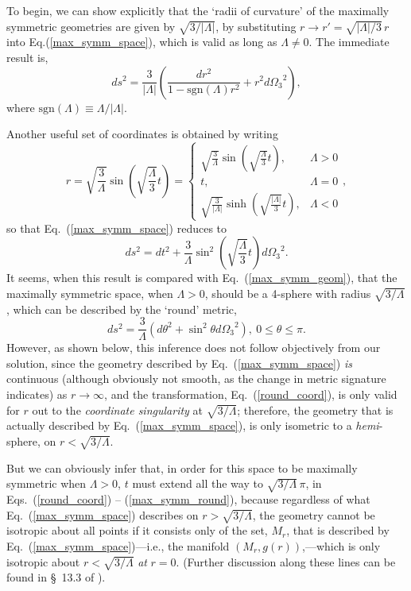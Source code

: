 To begin, we can show explicitly that the `radii of curvature' of the maximally symmetric geometries are given by $\sqrt{3/|\Lambda|}$, by substituting $r\rightarrow{r'}=\sqrt{|\Lambda|/3}\,r$ into Eq.(\ref{max_symm_space}), which is valid as long as $\Lambda\neq0$. The immediate result is,
\begin{equation}
ds^2=\frac{3}{|\Lambda|}\left(\frac{dr^2}{1-\mathrm{sgn}(\Lambda)r^2}+r^2{d\Omega_3}^2\right),\label{max_symm_geom}
\end{equation}
where $\mathrm{sgn}(\Lambda)\equiv\Lambda/|\Lambda|$.

Another useful set of coordinates is obtained by writing 
\begin{equation}
r=\sqrt{\frac{3}{\Lambda}}\sin\left(\sqrt{\frac{\Lambda}{3}}t\right)=\left\{\begin{array}{ll}
\sqrt{\frac{3}{\Lambda}}\sin\left(\sqrt{\frac{\Lambda}{3}}t\right), & \Lambda>0  \\ 
t, & \Lambda=0 \\ 
\sqrt{\frac{3}{|\Lambda|}}\sinh\left(\sqrt{\frac{|\Lambda|}{3}}t\right), & \Lambda<0
\end{array}\right.,\label{round_coord}
\end{equation}
so that Eq.~(\ref{max_symm_space}) reduces to
\begin{equation}
ds^2=dt^2+\frac{3}{\Lambda}\sin^2\left(\sqrt{\frac{\Lambda}{3}}t\right){d\Omega_3}^2.\label{max_symm_round}
\end{equation}
It seems, when this result is compared with Eq.~(\ref{max_symm_geom}), that the maximally symmetric space, when $\Lambda>0$, should be a 4-sphere with radius $\sqrt{3/\Lambda}$, which can be described by the `round' metric,
\begin{equation}
ds^2=\frac{3}{\Lambda}\left(d\theta^2+\sin^2\theta{d\Omega_3}^2\right),~0\leq\theta\leq\pi.\label{4sphere}
\end{equation}
However, as shown below, this inference does not follow objectively from our solution, since the geometry described by Eq.~(\ref{max_symm_space}) \textit{is} continuous (although obviously not smooth, as the change in metric signature indicates) as $r\rightarrow\infty$, and the transformation, Eq.~(\ref{round_coord}), is only valid for $r$ out to the \textit{coordinate singularity} at $\sqrt{3/\Lambda}$; therefore, the geometry that is actually described by Eq.~(\ref{max_symm_space}), is only isometric to a \textit{hemi}-sphere, on $r<\sqrt{3/\Lambda}$. 

But we can obviously infer that, in order for this space to be maximally symmetric when $\Lambda>0$, $t$ must extend all the way to $\sqrt{3/\Lambda}\,\pi$, in Eqs.~(\ref{round_coord}) -- (\ref{max_symm_round}), because regardless of what Eq.~(\ref{max_symm_space}) describes on $r>\sqrt{3/\Lambda}$, the geometry cannot be isotropic about all points if it consists only of the set, $M_r$, that is described by Eq.~(\ref{max_symm_space})---i.e., the manifold $(M_r,g(r))$,---which is only isotropic about $r<\sqrt{3/\Lambda}$ \textit{at} $r=0$. (Further discussion along these lines can be found in \S~13.3 of \cite{Weinberg1972}).


